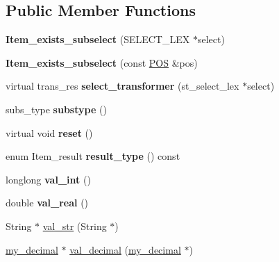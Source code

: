 \subsection*{Public Member Functions}
\begin{DoxyCompactItemize}
\item 
\mbox{\label{classItem__exists__subselect_a193dfafe864aa5a1287d38afe3fbc06a}} 
{\bfseries Item\+\_\+exists\+\_\+subselect} (S\+E\+L\+E\+C\+T\+\_\+\+L\+EX $\ast$select)
\item 
\mbox{\label{classItem__exists__subselect_aedbbde671a4962de7dd62949ad74f890}} 
{\bfseries Item\+\_\+exists\+\_\+subselect} (const \mbox{\hyperlink{structYYLTYPE}{P\+OS}} \&pos)
\item 
\mbox{\label{classItem__exists__subselect_a658b453be2f39f1bace527b7933d8d2b}} 
virtual trans\+\_\+res {\bfseries select\+\_\+transformer} (st\+\_\+select\+\_\+lex $\ast$select)
\item 
\mbox{\label{classItem__exists__subselect_ab315cdc17b456d7d2a834b35b2d29c57}} 
subs\+\_\+type {\bfseries substype} ()
\item 
\mbox{\label{classItem__exists__subselect_af40ef8411892eb9b3bffe4de9105f91d}} 
virtual void {\bfseries reset} ()
\item 
\mbox{\label{classItem__exists__subselect_a5b3dbda8ec13ebcb1ef911c82a2844d6}} 
enum Item\+\_\+result {\bfseries result\+\_\+type} () const
\item 
\mbox{\label{classItem__exists__subselect_a71862ccde424b6f0bbe9793c76830bd6}} 
longlong {\bfseries val\+\_\+int} ()
\item 
\mbox{\label{classItem__exists__subselect_a7009de1e41f8e7d023c038d9b6aab777}} 
double {\bfseries val\+\_\+real} ()
\item 
String $\ast$ \mbox{\hyperlink{classItem__exists__subselect_a008b448e0e9dab80098ece5e2ce18881}{val\+\_\+str}} (String $\ast$)
\item 
\mbox{\hyperlink{classmy__decimal}{my\+\_\+decimal}} $\ast$ \mbox{\hyperlink{classItem__exists__subselect_aa9f79b931ce496a3f4f962c2f325bee6}{val\+\_\+decimal}} (\mbox{\hyperlink{classmy__decimal}{my\+\_\+decimal}} $\ast$)

\end{DoxyCompactItemize}
